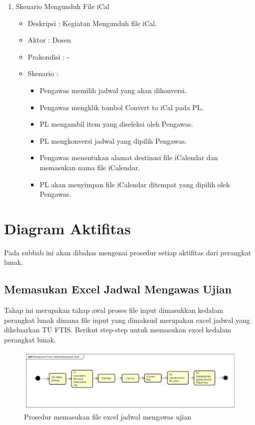 \begin{enumerate}
		\item Skenario Mengunduh File iCal 
		{\renewcommand\labelitemi{}
		\begin{itemize}
			\item Deskripsi		: Kegiatan Mengunduh file iCal.
			\item Aktor				: Dosen 
			\item Prakondisi	: -
			\item Skenario		:
				\begin{itemize}
					\item Pengawas memilih jadwal yang akan dikonversi.
					\item Pengawas mengklik tombol Convert to iCal pada PL.
					\item PL mengambil item yang diseleksi oleh Pengawas.
					\item PL mengkonversi jadwal yang dipilih Pengawas.
					\item Pengawas menentukan alamat destinasi file iCalendar dan memasukan nama file iCalendar.
					\item PL akan menyimpan file iCalendar ditempat yang dipilih oleh Pengawas.
				\end{itemize}
		\end{itemize}
		}
		
\end{enumerate}

\section{Diagram Aktifitas}
Pada subbab ini akan dibahas mengenai prosedur setiap aktifitas dari perangkat lunak.

\subsection{Memasukan Excel Jadwal Mengawas Ujian}
Tahap ini merupakan tahap awal proses file input dimasukkan kedalam perangkat lunak dimana file input yang dimaksud merupakan excel jadwal yang dikeluarkan TU FTIS. Berikut step-step untuk memasukan excel kedalam perangkat lunak.
\begin{figure}[h]
	\centering
	\includegraphics[scale=0.3]{Gambar/Memasukan-Excel-Jadwal-Mengawas-Ujian}
	\caption{Prosedur memasukan file excel jadwal mengawas ujian}
	\end{figure}
	
